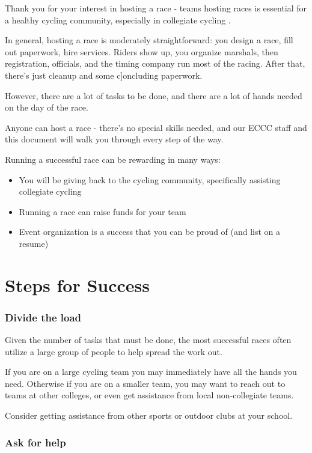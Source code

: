 \documentclass[
  letterpaper, %
  fontsize=10pt, %
  twoside=true,
  chapterentrydots=true, %
  numbers=noenddot,
  fontmethod=tex,
]{kaobook}
\begin{document}
Thank you for your interest in hosting a race -
teams hosting races is essential for a healthy cycling community,
especially in collegiate cycling%
.

In general, hosting a race is moderately straightforward:
you design a race, fill out paperwork, hire services.
Riders show up, you organize marshals, then registration, officials,
and the timing company run most of the racing.
After that, there's just cleanup and some c]oncluding paperwork.

However, there are a lot of tasks to be done,
and there are a lot of hands needed on the day of the race.

Anyone can host a race - there's no special skills needed,
and our ECCC staff and this document will walk you through every step of the way.

Running a successful race can be rewarding in many ways:
\begin{itemize}
  \item You will be giving back to the cycling community,
        specifically assisting collegiate cycling
  \item Running a race can raise funds for your team
  \item Event organization is a success that you can be proud of (and list on a resume)
\end{itemize}

\section{Steps for Success}

\subsubsection{Divide the load}
Given the number of tasks that must be done, the most successful races often
utilize a large group of people to help spread the work out.

If you are on a large cycling team you may immediately have all the hands you need.
Otherwise if you are on a smaller team, you may want to reach out to teams at other colleges, or even get assistance from local non-collegiate teams.

Consider getting assistance from other sports or outdoor clubs at your school.

\subsubsection{Ask for help}
\end{document}
